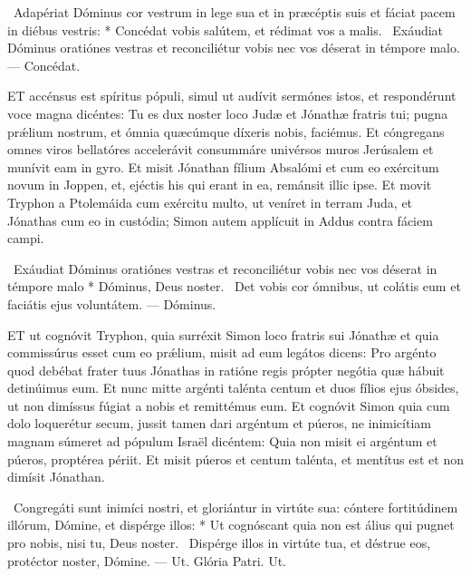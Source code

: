 \R\ Adapériat Dóminus cor vestrum in lege sua et in præcéptis suis et fáciat pacem in diébus vestris: * Concédat vobis salútem, et rédimat vos a malis. \V\ Exáudiat Dóminus oratiónes vestras et reconciliétur vobis nec vos déserat in témpore malo. — Concédat.


\lettrine[lines=2]{E}{T} accénsus est spíritus pópuli, simul ut audívit sermónes istos, et respondérunt voce magna dicéntes: Tu es dux noster loco Judæ et Jónathæ fratris tui; pugna prǽlium nostrum, et ómnia quæcúmque díxeris nobis, faciémus. Et cóngregans omnes viros bellatóres accelerávit consummáre univérsos muros Jerúsalem et munívit eam in gyro. Et misit Jónathan fílium Absalómi et cum eo exércitum novum in Joppen, et, ejéctis his qui erant in ea, remánsit illic ipse. Et movit Tryphon a Ptolemáida cum exércitu multo, ut veníret in terram Juda, et Jónathas cum eo in custódia; Simon autem applícuit in Addus contra fáciem campi.

\R\ Exáudiat Dóminus oratiónes vestras et reconciliétur vobis nec vos déserat in témpore malo * Dóminus, Deus noster. \V\ Det vobis cor ómnibus, ut colátis eum et faciátis ejus voluntátem. — Dóminus.



\lettrine[lines=2]{E}{T} ut cognóvit Tryphon, quia surréxit Simon loco fratris sui Jónathæ et quia commissúrus esset cum eo prǽlium, misit ad eum legátos dicens: Pro argénto quod debébat frater tuus Jónathas in ratióne regis própter negótia quæ hábuit detinúimus eum. Et nunc mitte argénti talénta centum et duos fílios ejus óbsides, ut non dimíssus fúgiat a nobis et remittémus eum. Et cognóvit Simon quia cum dolo loquerétur secum, jussit tamen dari argéntum et púeros, ne inimicítiam magnam súmeret ad pópulum Israël dicéntem: Quia non misit ei argéntum et púeros, proptérea périit. Et misit púeros et centum talénta, et mentítus est et non dimísit Jónathan.

\R\ Congregáti sunt inimíci nostri, et gloriántur in virtúte sua: cóntere fortitúdinem illórum, Dómine, et dispérge illos: * Ut cognóscant quia non est álius qui pugnet pro nobis, nisi tu, Deus noster. \V\ Dispérge illos in virtúte tua, et déstrue eos, protéctor noster, Dómine. — Ut. Glória Patri. Ut.


